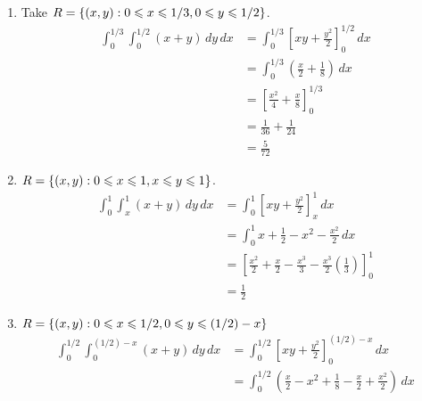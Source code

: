 \begin{Example}{}{}
\begin{enumerate}[label=(\roman*)]
\begin{enumerate}[label=(\alph*)]
                  \item Take $ R=\{(x,y):0\leqslant x\leqslant 1/3, 0\leqslant y
                                \leqslant 1/2\} $.
                        \begin{align*}
                            \int_{0}^{1/3} \int_{0}^{1/2} (x+y)\, d{y} \, d{x}
                             & =\int_{0}^{1/3}
                            \left[ xy +\frac{y^2}{2}  \right]_0^{1/2}\, d{x}                  \\
                             & =\int_{0}^{1/3} \left( \frac{x}{2} +\frac{1}{8} \right)\, d{x} \\
                             & =\left[ \frac{x^2}{4}+\frac{x}{8} \right]_0^{1/3}              \\
                             & =\frac{1}{36}+\frac{1}{24}                                     \\
                             & =\frac{5}{72}
                        \end{align*}
                  \item $ R=\{(x,y):0\leqslant x\leqslant 1,x\leqslant y\leqslant 1\} $.
                        \begin{align*}
                            \int_{0}^{1} \int_{x}^{1} (x+y)\, d{y} \, d{x}
                             & =\int_{0}^{1} \left[ xy +\frac{y^2}{2}  \right]_x^1 \, d{x} \\
                             & =\int_{0}^{1} x+\frac{1}{2}-x^2-\frac{x^2}{2}\, d{x}        \\
                             & =\left[ \frac{x^2}{2} +\frac{x}{2} -\frac{x^3}{3}-
                            \frac{x^3}{2}\left( \frac{1}{3} \right)  \right]_0^1           \\
                             & =\frac{1}{2}
                        \end{align*}
                  \item $ R=\{(x,y):0\leqslant x\leqslant
                                1/2,0\leqslant y\leqslant (1/2)-x \} $
                        \begin{align*}
                            \int_{0}^{1/2} \int_{0}^{(1/2)-x} (x+y)\, d{y} \, d{x}
                             & =\int_{0}^{1/2} \left[ xy+\frac{y^2}{2} \right]_{0}^{(1/2)-x}\, d{x}           \\
                             & =\int_{0}^{1/2} \left( \frac{x}{2} -x^2+\frac{1}{8}
                            -\frac{x}{2} +\frac{x^2}{2}   \right)\, d{x}                                      \\

\end{align*}
\end{enumerate}
\end{enumerate}
\end{Example}
